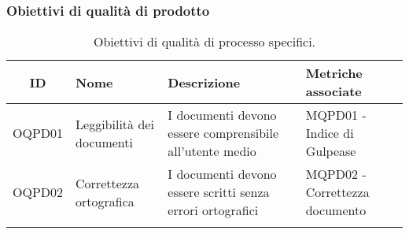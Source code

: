 \subsubsection{Obiettivi di qualità di prodotto}
\begin{table}[H]
	\centering
	\begin{tabularx}{\textwidth}{|c|X|X|X|}
		\hline
		\textbf{ID} & \textbf{Nome} & \textbf{Descrizione} & \textbf{Metriche associate}\\
		\hline
		OQPD01 & Leggibilità dei documenti & I documenti devono essere comprensibile all'utente medio & MQPD01 - Indice di Gulpease\\
		\hline
		OQPD02 & Correttezza ortografica & I documenti devono essere scritti senza errori ortografici & MQPD02 - Correttezza documento \\
		\hline
		\caption{Obiettivi di qualità di processo specifici.}
	\end{tabularx}
\end{table}
